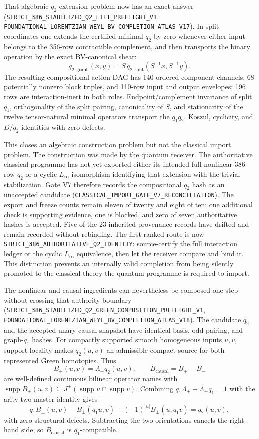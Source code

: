 \documentclass[11pt]{article}
\theoremstyle{definition}
\theoremstyle{remark}
\newcommand{\cert}[1]{\nolinkurl{#1}}
\begin{document}
That algebraic \(q_2\) extension problem now has an exact answer
(\cert{STRICT_386_STABILIZED_Q2_LIFT_PREFLIGHT_V1},
\cert{FOUNDATIONAL_LORENTZIAN_WEYL_BV_COMPLETION_ATLAS_V17}).  In split
coordinates one extends the certified minimal \(q_2\) by zero whenever either
input belongs to the 356-row contractible complement, and then transports the
binary operation by the exact BV-canonical shear:
\[
 q_{2,\mathrm{graph}}(x,y)
 =S\,q_{2,\mathrm{split}}(S^{-1}x,S^{-1}y).
\]
The resulting compositional action DAG has 140 ordered-component channels,
68 potentially nonzero block triples, and 110-row input and output envelopes;
196 rows are interaction-inert in both roles.  Endpoint/complement invariance
of split \(q_1\), orthogonality of the split pairing, canonicality of \(S\),
and stationarity of the twelve tensor-natural minimal operators transport the
\(q_1q_2\), Koszul, cyclicity, and \(D/q_2\) identities with zero defects.

This closes an algebraic construction problem but not the classical import
problem.  The construction was made by the quantum receiver.  The
authoritative classical programme has not yet exported either its intended
full nonlinear 386-row \(q_2\) or a cyclic \(L_\infty\) isomorphism identifying
that extension with the trivial stabilization.  Gate V7 therefore records
the compositional \(q_2\) hash as an unaccepted candidate
(\cert{CLASSICAL_IMPORT_GATE_V7_RECONCILIATION}).  The export and freeze counts
remain eleven of twenty and eight of ten; one additional check is supporting
evidence, one is blocked, and zero of seven authoritative hashes is accepted.
Five of the 23 inherited provenance records have drifted and remain recorded
without rebinding.  The first-ranked route is now
\cert{STRICT_386_AUTHORITATIVE_Q2_IDENTITY}: source-certify the full interaction
ledger or the cyclic \(L_\infty\) equivalence, then let the receiver compare
and bind it.  This distinction prevents an internally valid completion from
being silently promoted to the classical theory the quantum programme is
required to import.

The nonlinear and causal ingredients can nevertheless be composed one step
without crossing that authority boundary
(\cert{STRICT_386_STABILIZED_Q2_GREEN_COMPOSITION_PREFLIGHT_V1},
\cert{FOUNDATIONAL_LORENTZIAN_WEYL_BV_COMPLETION_ATLAS_V18}).  The candidate
\(q_2\) and the accepted unary-causal snapshot have identical basis, odd
pairing, and graph-\(q_1\) hashes.  For compactly supported smooth homogeneous
inputs \(u,v\), support locality makes \(q_2(u,v)\) an admissible compact
source for both represented Green homotopies.  Thus
\[
 B_\pm(u,v)=\Lambda_\pm q_2(u,v),\qquad
 B_{\mathrm{causal}}=B_+-B_-
\]
are well-defined continuous bilinear operator names with
\(\operatorname{supp} B_\pm(u,v)\subseteq
J^\pm(\operatorname{supp} u\cap\operatorname{supp} v)\).  Combining
\(q_1\Lambda_\pm+\Lambda_\pm q_1=1\) with the arity-two master identity gives
\[
 q_1B_\pm(u,v)-B_\pm(q_1u,v)-(-1)^{|u|}B_\pm(u,q_1v)=q_2(u,v),
\]
with zero structural defects.  Subtracting the two orientations cancels the
right-hand side, so \(B_{\mathrm{causal}}\) is \(q_1\)-compatible.
\end{document}
